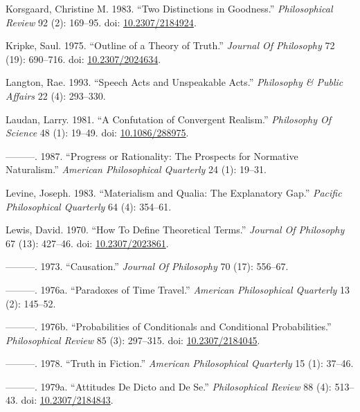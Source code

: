 \documentclass[
  10pt,
  letterpaper,
  DIV=11,
  numbers=noendperiod,
  twoside]{scrartcl}
\newlength{\cslhangindent}
\newenvironment{CSLReferences}[2] %
 {\begin{list}{}{%
  \setlength{\itemindent}{0pt}
  \setlength{\leftmargin}{0pt}
  \setlength{\parsep}{0pt}
  \ifodd #1
   \setlength{\leftmargin}{\cslhangindent}
   \setlength{\itemindent}{-1\cslhangindent}
  \fi
  \setlength{\itemsep}{#2\baselineskip}}}
 {\end{list}}
\begin{document}
\begin{CSLReferences}{1}{0}
Korsgaard, Christine M. 1983. {``Two Distinctions in Goodness.''}
\emph{Philosophical Review} 92 (2): 169--95. doi:
\href{https://doi.org/10.2307/2184924}{10.2307/2184924}.

Kripke, Saul. 1975. {``Outline of a Theory of Truth.''} \emph{Journal Of
Philosophy} 72 (19): 690--716. doi:
\href{https://doi.org/10.2307/2024634}{10.2307/2024634}.

Langton, Rae. 1993. {``Speech Acts and Unspeakable Acts.''}
\emph{Philosophy \& Public Affairs} 22 (4): 293--330.

Laudan, Larry. 1981. {``A Confutation of Convergent Realism.''}
\emph{Philosophy Of Science} 48 (1): 19--49. doi:
\href{https://doi.org/10.1086/288975}{10.1086/288975}.

---------. 1987. {``Progress or Rationality: The Prospects for Normative
Naturalism.''} \emph{American Philosophical Quarterly} 24 (1): 19--31.

Levine, Joseph. 1983. {``Materialism and Qualia: The Explanatory Gap.''}
\emph{Pacific Philosophical Quarterly} 64 (4): 354--61.

Lewis, David. 1970. {``How To Define Theoretical Terms.''} \emph{Journal
Of Philosophy} 67 (13): 427--46. doi:
\href{https://doi.org/10.2307/2023861}{10.2307/2023861}.

---------. 1973. {``Causation.''} \emph{Journal Of Philosophy} 70 (17):
556--67.

---------. 1976a. {``Paradoxes of Time Travel.''} \emph{American
Philosophical Quarterly} 13 (2): 145--52.

---------. 1976b. {``Probabilities of Conditionals and Conditional
Probabilities.''} \emph{Philosophical Review} 85 (3): 297--315. doi:
\href{https://doi.org/10.2307/2184045}{10.2307/2184045}.

---------. 1978. {``Truth in Fiction.''} \emph{American Philosophical
Quarterly} 15 (1): 37--46.

---------. 1979a. {``Attitudes De Dicto and De Se.''}
\emph{Philosophical Review} 88 (4): 513--43. doi:
\href{https://doi.org/10.2307/2184843}{10.2307/2184843}.


\end{CSLReferences}
\end{document}
